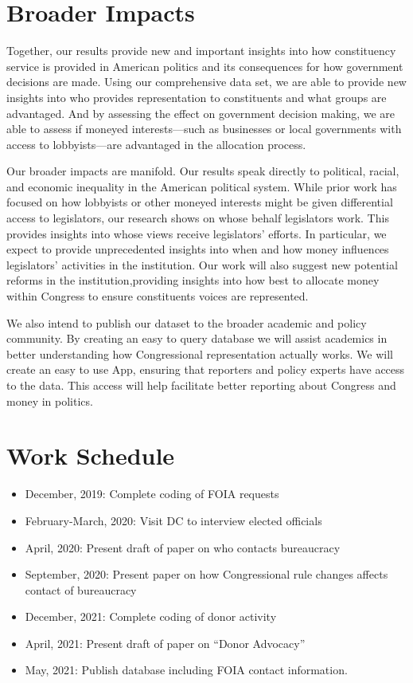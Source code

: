 \documentclass{article}
\begin{document}
\section{Broader Impacts}
Together, our results provide new and important insights into how constituency service is provided in American politics and its consequences for how government decisions are made.  Using our comprehensive data set, we are able to provide new insights into who provides representation to constituents and what groups are advantaged.  And by assessing the effect on government decision making, we are able to assess if moneyed interests---such as businesses or local governments with access to lobbyists---are advantaged in the allocation process. 

Our broader impacts are manifold. Our results speak directly to political, racial, and economic inequality in the American political system.  While prior work has focused on how lobbyists or other moneyed interests might be given differential access to legislators, our research shows on whose behalf legislators work.  This provides insights into whose views receive legislators' efforts.  In particular, we expect to provide unprecedented insights into when and how money influences legislators' activities in the institution.  Our work will also suggest new potential reforms in the institution,providing insights into how best to allocate money within Congress to ensure constituents voices are represented.  

We also intend to publish our dataset to the broader academic and policy community. By creating an easy to query database we will assist academics in better understanding how Congressional representation actually works.  We will create an easy to use App, ensuring that reporters and policy experts have access to the data.  This access will help facilitate better reporting about Congress and money in politics. 


\section{Work Schedule} 
\singlespace
\begin{itemize}
	\item[-] December, 2019: Complete coding of FOIA requests
	\item[-] February-March, 2020: Visit DC to interview elected officials
	\item[-] April, 2020: Present draft of paper on who contacts bureaucracy
	\item[-] September, 2020: Present paper on how Congressional rule changes affects contact of bureaucracy
	\item[-] December, 2021: Complete coding of donor activity
	\item[-] April, 2021: Present draft of paper on ``Donor Advocacy''
	\item[-] May, 2021: Publish database including FOIA contact information. 
\end{itemize}








\newpage
\singlespace


\end{document}
